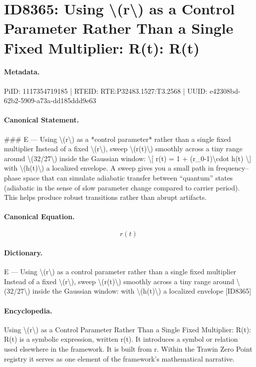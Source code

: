 \section*{ID8365: Using \textbackslash{}(r\textbackslash{}) as a Control Parameter Rather Than a Single Fixed Multiplier: R(t): R(t)}
\paragraph{Metadata.}
PiID: 1117354719185 | RTEID: RTE:P32483.1527:T3.2568 | UUID: e42308bd-62b2-5909-a73a-dd185ddd9e63

\paragraph{Canonical Statement.}
\#\#\# E — Using \textbackslash{}(r\textbackslash{}) as a *control parameter* rather than a single fixed multiplier Instead of a fixed \textbackslash{}(r\textbackslash{}), sweep \textbackslash{}(r(t)\textbackslash{}) smoothly across a tiny range around \textbackslash{}(32/27\textbackslash{}) inside the Gaussian window: \textbackslash{}[ r(t) = 1 + (r\_0-1)\textbackslash{}cdot h(t) \textbackslash{}] with \textbackslash{}(h(t)\textbackslash{}) a localized envelope. A sweep gives you a small path in frequency–phase space that can simulate adiabatic transfer between “quantum” states (adiabatic in the sense of slow parameter change compared to carrier period). This helps produce robust transitions rather than abrupt artifacts.

\paragraph{Canonical Equation.}
\[
r(t)
\]

\paragraph{Dictionary.}
E — Using \textbackslash{}(r\textbackslash{}) as a control parameter rather than a single fixed multiplier Instead of a fixed \textbackslash{}(r\textbackslash{}), sweep \textbackslash{}(r(t)\textbackslash{}) smoothly across a tiny range around \textbackslash{}(32/27\textbackslash{}) inside the Gaussian window: with \textbackslash{}(h(t)\textbackslash{}) a localized envelope [ID8365]

\paragraph{Encyclopedia.}
Using \textbackslash{}(r\textbackslash{}) as a Control Parameter Rather Than a Single Fixed Multiplier: R(t): R(t) is a symbolic expression, written r(t). It introduces a symbol or relation used elsewhere in the framework. It is built from r. Within the Trawin Zero Point registry it serves as one element of the framework's mathematical narrative.
